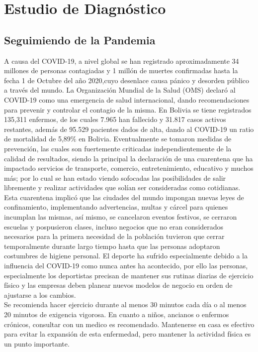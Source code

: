 \chapter{Estudio de Diagnóstico}

\section{Seguimiendo de la Pandemia}

A causa del COVID-19, a nivel global se han registrado aproximadamente 34 millones de personas contagiadas y 1 millón de muertes confirmadas hasta la fecha 1 de Octubre del año 2020,cuyo desenlace causa pánico y desorden público a través del mundo. La Organización Mundial de la Salud (OMS) declaró al COVID-19 como una emergencia de salud internacional, dando recomendaciones para prevenir y controlar el contagio de la misma. En Bolivia se tiene registrados 135,311 enfermos, de los cuales 7.965 han fallecido y 31.817 casos activos restantes, además de 95.529 pacientes dados de alta, dando al COVID-19 un ratio de mortalidad de 5,89\% en Bolivia. Eventualmente se tomaron medidas de prevención, las cuales son fuertemente criticadas independientemente de la calidad de resultados, siendo la principal la declaración de una cuarentena que ha impactado servicios de transporte, comercio, entretenimiento, educativo y muchos más; por lo cual se han estado viendo sofocadas las posibilidades de salir libremente y realizar actividades que solían ser consideradas como cotidianas.\\

Esta cuarentena implicó que las ciudades del mundo impongan nuevas leyes de confinamiento, implementando advertencias, multas y cárcel para quienes incumplan las mismas, así mismo, se cancelaron eventos festivos, se cerraron escuelas y pospusieron clases, incluso negocios que no eran considerados necesarios para la primera necesidad de la población tuvieron que cerrar temporalmente durante largo tiempo hasta que las personas adoptaron costumbres de higiene personal. El deporte ha sufrido especialmente debido a la influencia del COVID-19 como nunca antes ha acontecido, por ello las personas, especialmente los deportistas precisan de mantener sus rutinas diarias de ejercicio físico y las empresas deben planear nuevos modelos de negocio en orden de ajustarse a los cambios.\\

Se recomienda hacer ejercicio durante al menos 30 minutos cada día o al menos 20 minutos de exigencia vigorosa. En cuanto a niños, ancianos o enfermos crónicos, consultar con un medico es recomendado. Mantenerse en casa es efectivo para evitar la expansión de esta enfermedad, pero mantener la actividad física es un punto importante.\\


